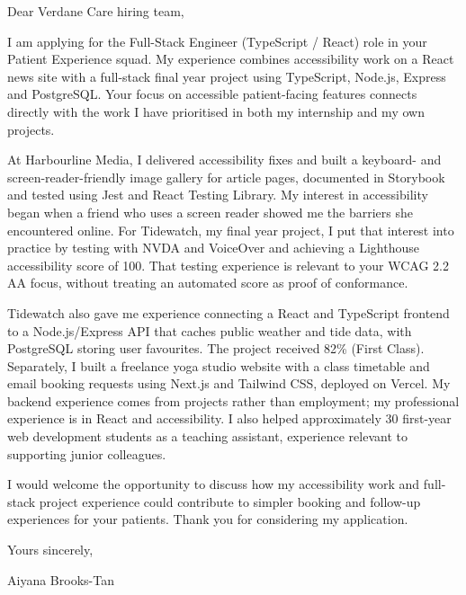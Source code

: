 \documentclass[11pt,a4paper]{article}
\begin{document}
Dear Verdane Care hiring team,

I am applying for the Full-Stack Engineer (TypeScript / React) role in your Patient Experience squad. My experience combines accessibility work on a React news site with a full-stack final year project using TypeScript, Node.js, Express and PostgreSQL. Your focus on accessible patient-facing features connects directly with the work I have prioritised in both my internship and my own projects.

At Harbourline Media, I delivered accessibility fixes and built a keyboard- and screen-reader-friendly image gallery for article pages, documented in Storybook and tested using Jest and React Testing Library. My interest in accessibility began when a friend who uses a screen reader showed me the barriers she encountered online. For Tidewatch, my final year project, I put that interest into practice by testing with NVDA and VoiceOver and achieving a Lighthouse accessibility score of 100. That testing experience is relevant to your WCAG 2.2 AA focus, without treating an automated score as proof of conformance.

Tidewatch also gave me experience connecting a React and TypeScript frontend to a Node.js/Express API that caches public weather and tide data, with PostgreSQL storing user favourites. The project received 82\% (First Class). Separately, I built a freelance yoga studio website with a class timetable and email booking requests using Next.js and Tailwind CSS, deployed on Vercel. My backend experience comes from projects rather than employment; my professional experience is in React and accessibility. I also helped approximately 30 first-year web development students as a teaching assistant, experience relevant to supporting junior colleagues.

I would welcome the opportunity to discuss how my accessibility work and full-stack project experience could contribute to simpler booking and follow-up experiences for your patients. Thank you for considering my application.

Yours sincerely,\par
Aiyana Brooks-Tan
\end{document}

